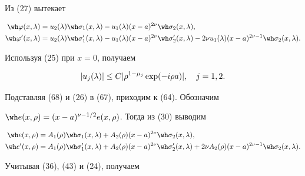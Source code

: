\begin{pf}


Из (27) вытекает


\begin{equation}


\begin{split}


\wh\vv(x,\la)&=u_2(\la)\wh\sigma_1(x,\la)-


u_1(\la)(x-a)^{2\nu}\wh\sigma_2(x,\la),\\


\wh\vv'(x,\la)&=u_2(\la)\wh\sigma'_1(x,\la)-


u_1(\la)(x-a)^{2\nu}\wh\sigma'_2(x,\la)


-2\nu u_1(\la)(x-a)^{2\nu-1}\wh\sigma_2(x,\la).


\end{split}


\end{equation}


Используя (25) при $x=0$, получаем


\begin{equation}


|u_j(\la)|\le C|\rho^{1-\mu_j}\exp(-i\rho a)|,\quad j=1,2.


\end{equation}


Подставляя (68) и (26) в (67), приходим к (64). Обозначим


$\wh e(x,\rho)=(x-a)^{\nu-1/2}e(x,\rho)$. Тогда из (30) выводим


\begin{equation}


\begin{split}


\wh e(x,\rho)&=A_1(\rho)\wh\sigma_1(x,\la)+


A_2(\rho)(x-a)^{2\nu}\wh\sigma_2(x,\la),\\


\wh e'(x,\rho)&=A_1(\rho)\wh\sigma'_1(x,\la)+


A_2(\rho)(x-a)^{2\nu}\wh\sigma'_2(x,\la)


+2\nu A_2(\rho)(x-a)^{2\nu-1}\wh\sigma_2(x,\la).


\end{split}


\end{equation}


Учитывая (36), (43) и (24), получаем


\begin{equation}



\end{equation}
\end{pf}
